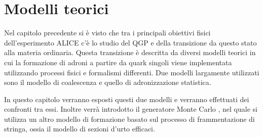 \chapter{Modelli teorici}\label{ch:modelli}
Nel capitolo precedente si è visto che tra i principali obiettivi fisici dell'esperimento ALICE c'è lo studio del QGP e della transizione da questo stato alla materia ordinaria.
Questa transizione è descritta da diversi modelli teorici in cui la formazione di adroni a partire da quark singoli viene implementata utilizzando processi fisici e formalismi differenti. 
Due modelli largamente utilizzati sono il modello di coalescenza e quello di adronizzazione statistica.

In questo capitolo verranno esposti questi due modelli e verranno effettuati dei confronti tra essi.
Inoltre verrà introdotto il generatore Monte Carlo \pythiaa{} \cite{pythia8300}, nel quale si utilizza un altro modello di formazione basato sul processo di frammentazione di stringa, ossia il modello di sezioni d'urto efficaci. 




